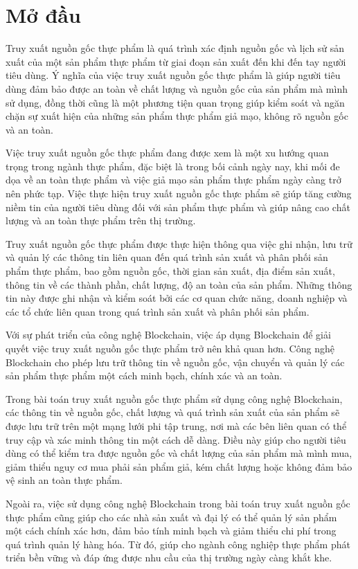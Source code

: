 \section*{Mở đầu}
\setcounter{page}{1}
Truy xuất nguồn gốc thực phẩm là quá trình xác định nguồn gốc và lịch sử sản xuất của một sản phẩm
thực phẩm từ giai đoạn sản xuất đến khi đến tay người tiêu dùng. Ý nghĩa của việc truy xuất nguồn 
gốc thực phẩm là giúp người tiêu dùng đảm bảo được an toàn về chất lượng và nguồn gốc của sản phẩm
mà mình sử dụng, đồng thời cũng là một phương tiện quan trọng giúp kiểm soát và ngăn chặn sự xuất
hiện của những sản phẩm thực phẩm giả mạo, không rõ nguồn gốc và an toàn.

Việc truy xuất nguồn gốc thực phẩm đang được xem là một xu hướng quan trọng trong ngành thực phẩm,
đặc biệt là trong bối cảnh ngày nay, khi mối đe dọa về an toàn thực phẩm và việc giả mạo sản phẩm 
thực phẩm ngày càng trở nên phức tạp. Việc thực hiện truy xuất nguồn gốc thực phẩm sẽ giúp tăng
cường niềm tin của người tiêu dùng đối với sản phẩm thực phẩm và giúp nâng cao chất lượng và an toàn thực phẩm trên thị trường.

Truy xuất nguồn gốc thực phẩm được thực hiện thông qua việc ghi nhận, lưu trữ và quản lý các thông
tin liên quan đến quá trình sản xuất và phân phối sản phẩm thực phẩm, bao gồm nguồn gốc, thời gian
sản xuất, địa điểm sản xuất, thông tin về các thành phần, chất lượng, độ an toàn của sản phẩm. 
Những thông tin này được ghi nhận và kiểm soát bởi các cơ quan chức năng, doanh nghiệp và các tổ 
chức liên quan trong quá trình sản xuất và phân phối sản phẩm.

Với sự phát triển của công nghệ Blockchain, việc áp dụng Blockchain để giải quyết việc truy xuất nguồn gốc 
thực phẩm trở nên khả quan hơn. Công nghệ Blockchain cho phép lưu trữ thông tin về nguồn gốc, vận chuyển và quản lý 
các sản phẩm thực phẩm một cách minh bạch, chính xác và an toàn.


Trong bài toán truy xuất nguồn gốc thực phẩm sử dụng công nghệ Blockchain, các thông tin về nguồn 
gốc, chất lượng và quá trình sản xuất của sản phẩm sẽ được lưu trữ trên một mạng lưới phi tập trung,
nơi mà các bên liên quan có thể truy cập và xác minh thông tin một cách dễ dàng. Điều này giúp cho 
người tiêu dùng có thể kiểm tra được nguồn gốc và chất lượng của sản phẩm mà mình mua, giảm thiểu 
nguy cơ mua phải sản phẩm giả, kém chất lượng hoặc không đảm bảo vệ sinh an toàn thực phẩm.

Ngoài ra, việc sử dụng công nghệ Blockchain trong bài toán truy xuất nguồn gốc thực phẩm cũng giúp
cho các nhà sản xuất và đại lý có thể quản lý sản phẩm một cách chính xác hơn, đảm bảo tính minh 
bạch và giảm thiểu chi phí trong quá trình quản lý hàng hóa. Từ đó, giúp cho ngành công nghiệp thực
phẩm phát triển bền vững và đáp ứng được nhu cầu của thị trường ngày càng khắt khe.

